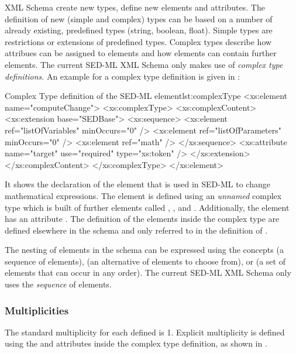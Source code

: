 XML Schema  create new types,  define new elements and attributes.
The definition of new (simple and complex) types can be based on a number of already existing, predefined types (string, boolean, float). Simple types are restrictions or extensions of predefined types. Complex types describe how attribues can be assigned to elements and how elements can contain further elements. The current SED-ML XML Schema only makes use of \emph{complex type definitions}. An example for a complex type definition is given in :

\begin{myXmlLst}{Complex Type definition of the SED-ML  element}{lst:complexType}
<xs:element name="computeChange">
	<xs:complexType>
		<xs:complexContent>
			<xs:extension base="SEDBase">
				<xs:sequence>
					<xs:element ref="listOfVariables" minOccurs="0" />
					<xs:element ref="listOfParameters" minOccurs="0" />
					<xs:element ref="math" />
				</xs:sequence>
				<xs:attribute name="target" use="required" type="xs:token" />
			</xs:extension>
		</xs:complexContent>
	</xs:complexType>
</xs:element>
\end{myXmlLst}

It shows the declaration of the element  that is used in SED-ML to change mathematical expressions. The element is defined using an \emph{unnamed} complex type which is built of further elements called , , and . Additionally, the element  has an attribute . The definition of the elements inside the complex type are defined elsewhere in the schema and only referred to in the definition of .

The nesting of elements in the schema can be expressed using the concepts  (a sequence of elements),  (an alternative of elements to choose from), or  (a set of elements that can occur in any order). The current SED-ML XML Schema only uses the \emph{sequence} of elements. 


\subsubsection{Multiplicities}
The standard multiplicity for each defined  is 1. Explicit multiplicity is defined using the  and  attributes inside the complex type definition, as shown in .

